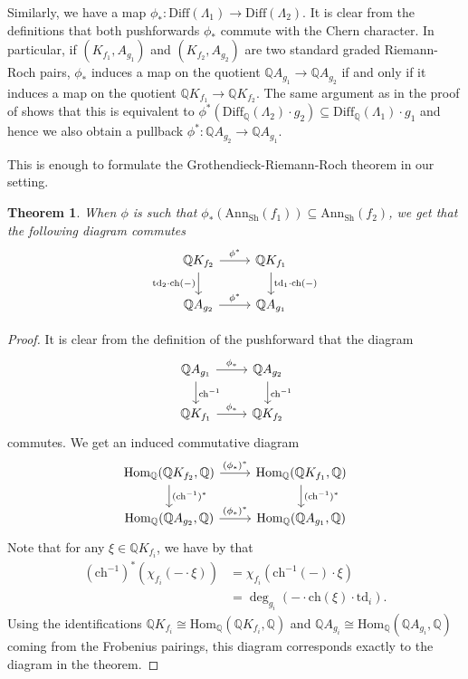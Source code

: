 \documentclass[oneside]{amsart}
\theoremstyle{plain}
\newtheorem{theorem}{Theorem}[section]
\theoremstyle{definition}
\newcommand{\Q}{{\mathbb{Q}}}
\newcommand{\Ann}{{\mathrm{Ann}}}
\newcommand{\Diff}{{\mathrm{Diff}}}
\newcommand{\Hom}{{\mathrm{Hom}}}
\newcommand{\Sh}{{\mathrm{Sh}}}
\newcommand{\ch}{{\mathrm{ch}}}
\newcommand{\td}{{\mathrm{td}}}
\begin{document}
Similarly, we have a map $\phi_*: \Diff(\Lambda_1) \to \Diff(\Lambda_2)$.
It is clear from the definitions that both pushforwards $\phi_*$ commute with the Chern character. In particular, if $(K_{f_1}, A_{g_1})$
and $(K_{f_2}, A_{g_2})$ are two standard graded Riemann-Roch pairs, $\phi_*$ induces a map on the quotient $\Q A_{g_1} \to \Q A_{g_2}$ if and only if it induces a map on the quotient $\Q K_{f_1} \to \Q K_{f_2}$.
The same argument as in the proof of  shows that this is equivalent to $\phi^*(\Diff_\Q(\Lambda_2)\cdot g_2) \subseteq \Diff_\Q(\Lambda_1) \cdot g_1$ and hence we also obtain a pullback $\phi^*: \Q A_{g_2} \to \Q A_{g_1}$.

This is enough to formulate the Grothendieck-Riemann-Roch theorem in our setting.

\begin{theorem}\label{thm:grr}
When $\phi$ is such that $\phi_*(\Ann_\Sh(f_1)) \subseteq \Ann_\Sh(f_2)$, we get that the following diagram commutes
\[
\begin{tikzcd}
\Q K_{f_2} \arrow[d, "\td_2\cdot \ch(-)"'] \arrow[r, "\phi^*"] & \Q K_{f_1} \arrow[d, "\td_1\cdot\ch(-)"] \\
\Q A_{g_2} \arrow[r, "\phi^*"]                          & \Q A_{g_1}                         
\end{tikzcd}
\]
\end{theorem}

\begin{proof}
It is clear from the definition of the pushforward that the diagram
\[
\begin{tikzcd}
\Q A_{g_1} \arrow[d, "\ch^{-1}"] \arrow[r, "\phi_*"] & \Q A_{g_2} \arrow[d, "\ch^{-1}"] \\
\Q K_{f_1} \arrow[r, "\phi_*"]                       & \Q K_{f_2}                    
\end{tikzcd}
\]
commutes. We get an induced commutative diagram
\[
\begin{tikzcd}
\Hom_\Q(\Q K_{f_2}, \Q) \arrow[r, "(\phi_*)^*"] \arrow[d, "(\ch^{-1})^*"] & \Hom_\Q(\Q K_{f_1}, \Q) \arrow[d, "(\ch^{-1})^*"] \\
\Hom_\Q(\Q A_{g_2}, \Q) \arrow[r, "(\phi_*)^*"]                           & \Hom_\Q(\Q A_{g_1}, \Q)                          
\end{tikzcd}
\]
Note that for any $\xi \in \Q K_{f_i}$, we have by  that
\begin{align*}
    (\ch^{-1})^*(\chi_{f_i}(-\cdot \xi)) &= 
    \chi_{f_i}(\ch^{-1}(-) \cdot \xi)\\
    &= \deg_{g_i}(- \cdot \ch(\xi) \cdot \td_i).
\end{align*}
Using the identifications $\Q K_{f_i} \cong \Hom_\Q(\Q K_{f_i}, \Q)$
and $\Q A_{g_i} \cong \Hom_\Q(\Q A_{g_i}, \Q)$ coming from the Frobenius pairings, this diagram corresponds exactly to the diagram in the theorem.
\end{proof}
\end{document}
